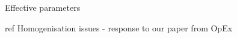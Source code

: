 Effective parameters

ref Homogenisation issues - response to our paper from OpEx
\cite{rockstuhl2008transition}
\cite{paul2011reflection}
\cite{andryieuski2012bloch}
\cite{andryieuski2010homogenization} 
\cite{simovski2007bloch}
\cite{simovski2009material}
\cite{simovski2011electromagnetic}
\cite{mortensen2010unambiguous}




